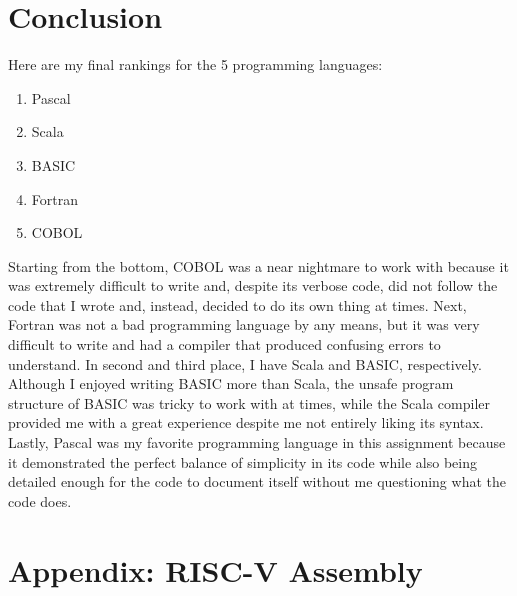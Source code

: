 \documentclass[letterpaper, 10pt, DIV=13]{scrartcl}
\numberwithin{equation}{section}
\numberwithin{figure}{section}
\numberwithin{table}{section}
\begin{document}
\section{Conclusion}
Here are my final rankings for the 5 programming languages:
\begin{enumerate}
	\item Pascal
	\item Scala
	\item BASIC
	\item Fortran
	\item COBOL
\end{enumerate}

Starting from the bottom, COBOL was a near nightmare to work with because it was extremely difficult to write and, despite its verbose code, did not follow the code that I wrote and, instead, decided to do its own thing at times. Next, Fortran was not a bad programming language by any means, but it was very difficult to write and had a compiler that produced confusing errors to understand. In second and third place, I have Scala and BASIC, respectively. Although I enjoyed writing BASIC more than Scala, the unsafe program structure of BASIC was tricky to work with at times, while the Scala compiler provided me with a great experience despite me not entirely liking its syntax. Lastly, Pascal was my favorite programming language in this assignment because it demonstrated the perfect balance of simplicity in its code while also being detailed enough for the code to document itself without me questioning what the code does.

\section{Appendix: RISC-V Assembly}
\end{document}
